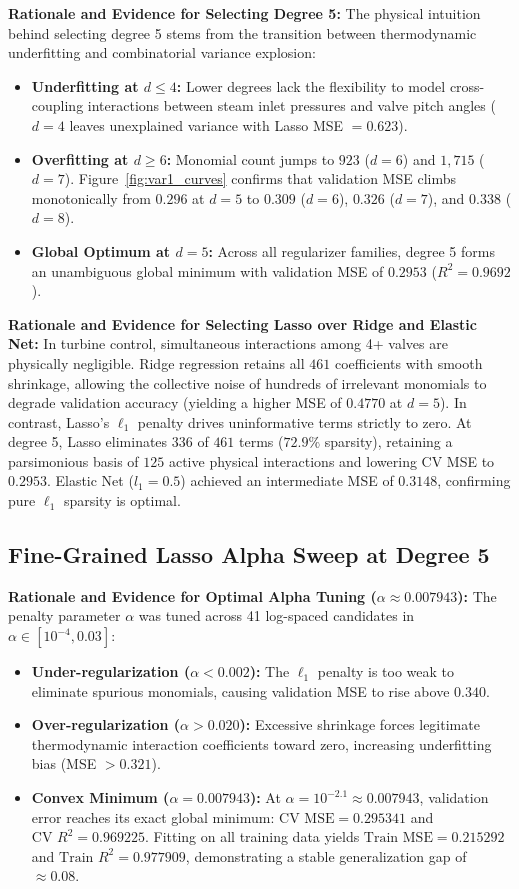 \documentclass[10pt,a4paper]{article}
\begin{document}
\textbf{Rationale and Evidence for Selecting Degree 5:} The physical intuition behind selecting degree 5 stems from the transition between thermodynamic underfitting and combinatorial variance explosion:
\begin{itemize}
    \item \textbf{Underfitting at $d \le 4$:} Lower degrees lack the flexibility to model cross-coupling interactions between steam inlet pressures and valve pitch angles ($d=4$ leaves unexplained variance with Lasso MSE $= 0.623$).
    \item \textbf{Overfitting at $d \ge 6$:} Monomial count jumps to $923$ ($d=6$) and $1{,}715$ ($d=7$). Figure~\ref{fig:var1_curves} confirms that validation MSE climbs monotonically from $0.296$ at $d=5$ to $0.309$ ($d=6$), $0.326$ ($d=7$), and $0.338$ ($d=8$).
    \item \textbf{Global Optimum at $d = 5$:} Across all regularizer families, degree 5 forms an unambiguous global minimum with validation MSE of $0.2953$ ($R^2 = 0.9692$).
\end{itemize}

\textbf{Rationale and Evidence for Selecting Lasso over Ridge and Elastic Net:} In turbine control, simultaneous interactions among 4+ valves are physically negligible. Ridge regression retains all $461$ coefficients with smooth shrinkage, allowing the collective noise of hundreds of irrelevant monomials to degrade validation accuracy (yielding a higher MSE of $0.4770$ at $d=5$). In contrast, Lasso's $\ell_1$ penalty drives uninformative terms strictly to zero. At degree 5, Lasso eliminates $336$ of $461$ terms ($72.9\%$ sparsity), retaining a parsimonious basis of $125$ active physical interactions and lowering CV MSE to $0.2953$. Elastic Net ($l_1 = 0.5$) achieved an intermediate MSE of $0.3148$, confirming pure $\ell_1$ sparsity is optimal.

\subsection{Fine-Grained Lasso Alpha Sweep at Degree 5}
\textbf{Rationale and Evidence for Optimal Alpha Tuning ($\alpha \approx 0.007943$):} The penalty parameter $\alpha$ was tuned across 41 log-spaced candidates in $\alpha \in [10^{-4}, 0.03]$:
\begin{itemize}
    \item \textbf{Under-regularization ($\alpha < 0.002$):} The $\ell_1$ penalty is too weak to eliminate spurious monomials, causing validation MSE to rise above $0.340$.
    \item \textbf{Over-regularization ($\alpha > 0.020$):} Excessive shrinkage forces legitimate thermodynamic interaction coefficients toward zero, increasing underfitting bias (MSE $> 0.321$).
    \item \textbf{Convex Minimum ($\alpha = 0.007943$):} At $\alpha = 10^{-2.1} \approx 0.007943$, validation error reaches its exact global minimum: $\text{CV MSE} = 0.295341$ and $\text{CV } R^2 = 0.969225$. Fitting on all training data yields $\text{Train MSE} = 0.215292$ and $\text{Train } R^2 = 0.977909$, demonstrating a stable generalization gap of $\approx 0.08$.
\end{itemize}
\end{document}
